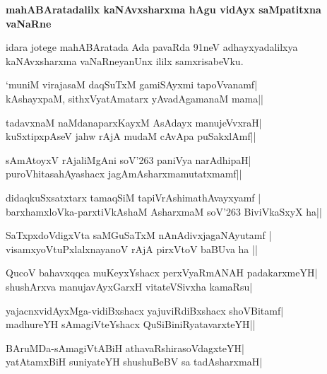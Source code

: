 \noindent
\textbf{mahABAratadalilx kaNAvxsharxma hAgu vidAyx saMpatitxna vaNaRne}\label{page57}

idara jotege mahABAratada Ada pavaRda 91neV adhayxyadalilxya kaNAvxsharxma vaNaRneyanUnx ililx samxrisabeVku.

\begin{shloka}
`muniM virajasaM daqSuTxM gamiSAyxmi tapoVvanamf|\\\label{58}
kAshayxpaM, sithxVyatAmatarx yAvadAgamanaM mama||
\end{shloka}

\begin{shloka}
tadavxnaM naMdanaparxKayxM AsAdayx manujeVvxraH|\\
kuSxtipxpAseV ja{hw} rAjA mudaM cAvApa puSakxlAmf||
\end{shloka}

\begin{shloka}
sAmAtoyxV rAjaliMgAni soV\char'263 paniVya narAdhipaH|\\
puroVhitasahAyashacx jagAmAsharxmamutatxmamf||
\end{shloka}

\begin{shloka}
didaqkuSxsatxtarx tamaqSiM tapiVrAshimathAvayxyamf |\\
barxhamxloVka-parxtiVkAshaM AsharxmaM soV\char'263 BiviVkaSxyX ha||
\end{shloka}

\begin{shloka}
SaTxpxdoVdigxVta saMGuSaTxM nAnAdivxjagaNAyutamf |\\
visamxyoVtuPxlalxnayanoV rAjA pirxVtoV baBUva ha ||
\end{shloka}

\begin{shloka}
QucoV bahavxqqca muKeyxYshacx perxVyaRmANAH padakarxmeYH|\\
shushArxva manujavAyxGarxH vitateVSivxha kamaRsu|
\end{shloka}

\begin{shloka}
yajacnxvidAyxMga-vidiBxshacx yajuviRdiBxshacx shoVBitamf|\\
madhureYH sAmagiVteYshacx QuSiBiniRyatavarxteYH||
\end{shloka}

\begin{shloka}
BAruMDa-sAmagiVtABiH athavaRshirasoVdagxteYH|\\
yatAtamxBiH suniyateYH shushuBeBV sa tadAsharxmaH|
\end{shloka}

